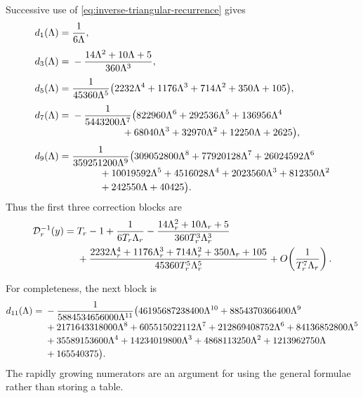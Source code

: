 \documentclass[11pt,a4paper,oneside]{article}
\theoremstyle{plain}
\theoremstyle{definition}
\theoremstyle{remark}
\newcommand{\D}{\mathcal D}
\begin{document}
Successive use of \cref{eq:inverse-triangular-recurrence} gives
\begin{align}
 d_1(\Lambda)={}&\frac1{6\Lambda},
 \label{eq:d1}\\[0.35em]
 d_3(\Lambda)={}&-\frac{14\Lambda^2+10\Lambda+5}
 {360\Lambda^3},
 \label{eq:d3}\\[0.35em]
 d_5(\Lambda)={}&\frac{1}{45360\Lambda^5}
 \bigl(2232\Lambda^4+1176\Lambda^3+714\Lambda^2
 +350\Lambda+105\bigr),
 \label{eq:d5}\\[0.35em]
 d_7(\Lambda)={}&-\frac{1}{5443200\Lambda^7}
 \bigl(822960\Lambda^6+292536\Lambda^5+136956\Lambda^4
 \notag\\[-0.2em]
 &\hspace{5.1em}{}+68040\Lambda^3+32970\Lambda^2
 +12250\Lambda+2625\bigr),
 \label{eq:d7}\\[0.35em]
 d_9(\Lambda)={}&\frac{1}{359251200\Lambda^9}
 \bigl(309052800\Lambda^8+77920128\Lambda^7+26024592\Lambda^6
 \notag\\[-0.2em]
 &\hspace{2.8em}{}+10019592\Lambda^5+4516028\Lambda^4
 +2023560\Lambda^3+812350\Lambda^2
 \notag\\[-0.2em]
 &\hspace{2.8em}{}+242550\Lambda+40425\bigr).
 \label{eq:d9}
\end{align}
Thus the first three correction blocks are
\begin{align}
 \D_r^{-1}(y)={}&T_r-1+\frac{1}{6T_r\Lambda_r}
 -\frac{14\Lambda_r^2+10\Lambda_r+5}
 {360T_r^3\Lambda_r^3}
 \notag\\
 &+\frac{2232\Lambda_r^4+1176\Lambda_r^3+714\Lambda_r^2
 +350\Lambda_r+105}{45360T_r^5\Lambda_r^5}
 +O\!\left(\frac1{T_r^7\Lambda_r}\right).
 \label{eq:first-three-inverse-blocks}
\end{align}

For completeness, the next block is
\begin{align}
 d_{11}(\Lambda)={}&-\frac{1}{5884534656000\Lambda^{11}}
 \bigl(46195687238400\Lambda^{10}+8854370366400\Lambda^9
 \notag\\[-0.2em]
 &+2171643318000\Lambda^8+605515022112\Lambda^7
 +212869408752\Lambda^6+84136852800\Lambda^5
 \notag\\[-0.2em]
 &+35589153600\Lambda^4+14234019800\Lambda^3
 +4868113250\Lambda^2+1213962750\Lambda
 \notag\\[-0.2em]
 &+165540375\bigr).
 \label{eq:d11}
\end{align}
The rapidly growing numerators are an argument for using the general formulae
rather than storing a table.
\end{document}
